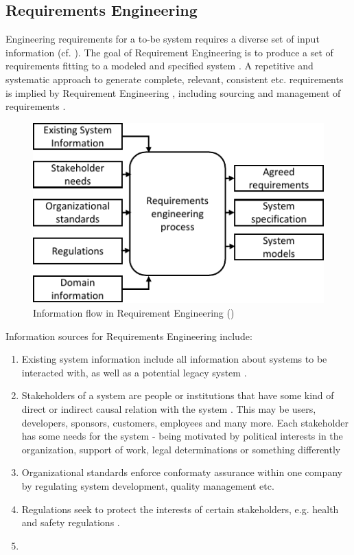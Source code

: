 \subsection{Requirements Engineering}
Engineering requirements for a to-be system requires a diverse set of input information (cf. ). The goal of Requirement Engineering is to produce a set of requirements fitting to a modeled and specified system \parencite[cf.][28]{Kotonya.2000}. A repetitive and systematic approach to generate complete, relevant, consistent etc. requirements is implied by Requirement Engineering \parencite[5]{Sommerville.2000}, including sourcing and management of requirements \parencite[262]{Pohl.2007}.
\begin{figure}[H]
    \centering
    \includegraphics[scale=1.3]{img/RequirementInformationStream.pdf}
    \caption[Information flow in Requirements Engineering]{Information flow in Requirement Engineering (\protect\cite[28]{Kotonya.2000})}
    \label{fig:reqFlow}
\end{figure}
Information sources for Requirements Engineering include:
\begin{enumerate}
    \item Existing system information include all information about systems to be interacted with, as well as a potential legacy system \parencite[cf.][28]{Kotonya.2000}.
    \item Stakeholders of a system are people or institutions that have some kind of direct or indirect causal relation with the system \parencite[cf.][8]{Sommerville.2000}. This may be users, developers, sponsors, customers, employees and many more. Each stakeholder has some needs for the system - being motivated by political interests in the organization, support of work, legal determinations or something differently \parencites[cf.][28]{Kotonya.2000}[cf.][350-351]{Lauesen.2008}
    \item Organizational standards enforce conformaty assurance within one company by regulating system development, quality management etc. \parencite[28]{Kotonya.2000}
    \item Regulations seek to protect the interests of certain stakeholders, e.g. health and safety regulations \parencite[cf.][28]{Kotonya.2000}.
    \item {} \parencite[28]{Kotonya.2000} 
\end{enumerate}

